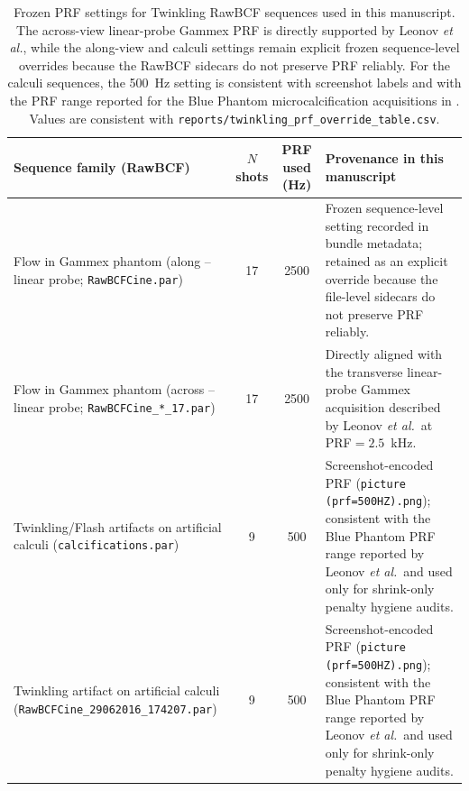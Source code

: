 \documentclass[11pt]{article}
\DeclareRobustCommand{\path}[1]{\nolinkurl{#1}}
\begin{document}
\begin{table}[t]
\centering
\small
\begin{tabular}{P{6.6cm} c c P{6.0cm}}
\hline
Sequence family (RawBCF) & $N$ shots & PRF used (Hz) & Provenance in this manuscript \\
\hline
Flow in Gammex phantom (along -- linear probe; \texttt{RawBCFCine.par}) & 17 & 2500 & Frozen sequence-level setting recorded in bundle metadata; retained as an explicit override because the file-level sidecars do not preserve PRF reliably. \\
Flow in Gammex phantom (across -- linear probe; \texttt{RawBCFCine\_*\_17.par}) & 17 & 2500 & Directly aligned with the transverse linear-probe Gammex acquisition described by Leonov \emph{et al.}\ at PRF$=2.5$~kHz. \\
Twinkling/Flash artifacts on artificial calculi (\texttt{calcifications.par}) & 9 & 500 & Screenshot-encoded PRF (\texttt{picture (prf=500HZ).png}); consistent with the Blue Phantom PRF range reported by Leonov \emph{et al.}\ and used only for shrink-only penalty hygiene audits. \\
Twinkling artifact on artificial calculi (\texttt{RawBCFCine\_29062016\_174207.par}) & 9 & 500 & Screenshot-encoded PRF (\texttt{picture (prf=500HZ).png}); consistent with the Blue Phantom PRF range reported by Leonov \emph{et al.}\ and used only for shrink-only penalty hygiene audits. \\
\hline
\end{tabular}
\caption{Frozen PRF settings for Twinkling RawBCF sequences used in this manuscript. The across-view linear-probe Gammex PRF is directly supported by Leonov \emph{et al.}, while the along-view and calculi settings remain explicit frozen sequence-level overrides because the RawBCF sidecars do not preserve PRF reliably. For the calculi sequences, the 500~Hz setting is consistent with screenshot labels and with the PRF range reported for the Blue Phantom microcalcification acquisitions in \cite{LeonovTwinklingDD2021}. Values are consistent with \path{reports/twinkling_prf_override_table.csv}.}
\label{tab:twinkling_prf_override}
\end{table}
\end{document}
